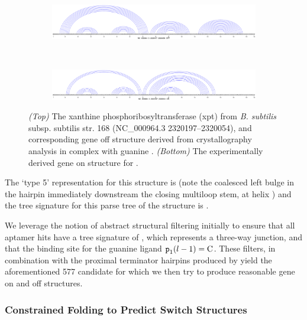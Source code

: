 \begin{figure}[!ht]
\centering
\begin{subfigure}[h]{\textwidth}
\centering
\includegraphics[width=.9\textwidth]{Figures/Ribofinder/NC_000964_3_2320197_2320054_OFF.pdf}
\end{subfigure} \\
\medskip
\begin{subfigure}[h]{\textwidth}
\centering
\includegraphics[width=.9\textwidth]{Figures/Ribofinder/NC_000964_3_2320197_2320054_ON.pdf}
\end{subfigure}
\caption{{\em (Top)} The xanthine phosphoribosyltransferase (xpt) \grb from
{\em B. subtilis} subsp. subtilis str. 168 (NC\_000964.3 2320197--2320054),
and corresponding gene off structure derived from crystallography analysis in
complex with guanine \cite{breaker:riboswitch2}. {\em (Bottom)} The experimentally
derived gene on structure for \Bsxpt.}
\label{fig:rfinder:xptOff}
\end{figure}

The \rshapes `type 5' representation for this structure is \ms{[[][]][][]} (note the coalesced left bulge in the hairpin immediately downstream the closing multiloop stem, at helix ) and the tree signature for this parse tree of the structure is \ms{[0,1,2,2,1,1]}.

We leverage the notion of abstract structural filtering initially to ensure that all \infernal aptamer hits have a tree signature of \ms{[0,1,2,2]}, which represents a three-way junction, and that the binding site for the guanine ligand ${\text{\mbox{\tt p}}}_{\text{1}}(l - 1) = \text{C}$. These filters, in combination with the proximal terminator hairpins produced by \tthp yield the aforementioned 577 candidate \grbs for which we then try to produce reasonable gene on and off structures.

\subsubsection{Constrained Folding to Predict Switch Structures}
\label{subsubsec:rfinder:consfold}

